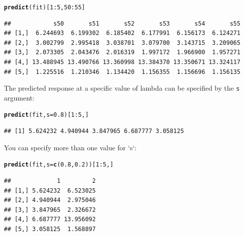 \documentclass[12pt,letter]{article}\usepackage[]{graphicx}\usepackage[]{color}
\makeatletter
\newcommand{\hlnum}[1]{\textcolor[rgb]{0.686,0.059,0.569}{#1}}%
\newcommand{\hlopt}[1]{\textcolor[rgb]{0,0,0}{#1}}%
\newcommand{\hlstd}[1]{\textcolor[rgb]{0.345,0.345,0.345}{#1}}%
\newcommand{\hlkwc}[1]{\textcolor[rgb]{0.333,0.667,0.333}{#1}}%
\newcommand{\hlkwd}[1]{\textcolor[rgb]{0.737,0.353,0.396}{\textbf{#1}}}%
\newenvironment{kframe}{%
 \def\at@end@of@kframe{}%
 \ifinner\ifhmode%
  \def\at@end@of@kframe{\end{minipage}}%
  \begin{minipage}{\columnwidth}%
 \fi\fi%
 \def\FrameCommand##1{\hskip\@totalleftmargin \hskip-\fboxsep
 \colorbox{shadecolor}{##1}\hskip-\fboxsep
     \hskip-\linewidth \hskip-\@totalleftmargin \hskip\columnwidth}%
 \MakeFramed {\advance\hsize-\width
   \@totalleftmargin\z@ \linewidth\hsize
   \@setminipage}}%
 {\par\unskip\endMakeFramed%
 \at@end@of@kframe}
\newenvironment{knitrout}{}{} %
\makeatother
\begin{document}
\begin{knitrout}\scriptsize
{}\color{fgcolor}\begin{kframe}
\begin{alltt}
\hlkwd{predict}\hlstd{(fit)[}\hlnum{1}\hlopt{:}\hlnum{5}\hlstd{,}\hlnum{50}\hlopt{:}\hlnum{55}\hlstd{]}
\end{alltt}
\begin{verbatim}
##            s50       s51       s52       s53       s54       s55
## [1,]  6.244693  6.199302  6.185402  6.177991  6.156173  6.124271
## [2,]  3.002799  2.995418  3.038701  3.079700  3.143715  3.209065
## [3,]  2.073305  2.043476  2.016319  1.997172  1.966900  1.957271
## [4,] 13.488945 13.490766 13.360998 13.384370 13.350671 13.324117
## [5,]  1.225516  1.210346  1.134420  1.156355  1.156696  1.156135
\end{verbatim}
\end{kframe}
\end{knitrout}


The predicted response at a specific value of lambda can be specified by the \texttt{s} argument:

\begin{knitrout}\scriptsize
{}\color{fgcolor}\begin{kframe}
\begin{alltt}
\hlkwd{predict}\hlstd{(fit,} \hlkwc{s} \hlstd{=} \hlnum{0.8}\hlstd{)[}\hlnum{1}\hlopt{:}\hlnum{5}\hlstd{, ]}
\end{alltt}
\begin{verbatim}
## [1] 5.624232 4.940944 3.847965 6.687777 3.058125
\end{verbatim}
\end{kframe}
\end{knitrout}


You can specify more than one value for `s`:

\begin{knitrout}\scriptsize
{}\color{fgcolor}\begin{kframe}
\begin{alltt}
\hlkwd{predict}\hlstd{(fit,} \hlkwc{s} \hlstd{=} \hlkwd{c}\hlstd{(}\hlnum{0.8}\hlstd{,} \hlnum{0.2}\hlstd{))[}\hlnum{1}\hlopt{:}\hlnum{5}\hlstd{, ]}
\end{alltt}
\begin{verbatim}
##             1         2
## [1,] 5.624232  6.523025
## [2,] 4.940944  2.975046
## [3,] 3.847965  2.326672
## [4,] 6.687777 13.956092
## [5,] 3.058125  1.568897
\end{verbatim}
\end{kframe}
\end{knitrout}
\end{document}
